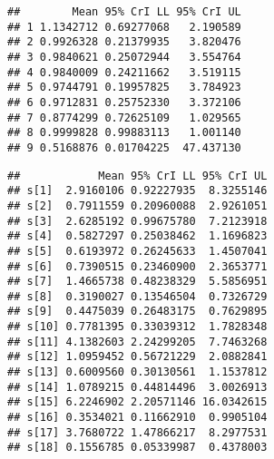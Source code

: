 \documentclass[]{article}
\newenvironment{Shaded}{\begin{snugshade}}{\end{snugshade}}
\newcommand{\CommentTok}[1]{\textcolor[rgb]{0.56,0.35,0.01}{\textit{#1}}}
\newcommand{\ControlFlowTok}[1]{\textcolor[rgb]{0.13,0.29,0.53}{\textbf{#1}}}
\newcommand{\DataTypeTok}[1]{\textcolor[rgb]{0.13,0.29,0.53}{#1}}
\newcommand{\DecValTok}[1]{\textcolor[rgb]{0.00,0.00,0.81}{#1}}
\newcommand{\FloatTok}[1]{\textcolor[rgb]{0.00,0.00,0.81}{#1}}
\newcommand{\KeywordTok}[1]{\textcolor[rgb]{0.13,0.29,0.53}{\textbf{#1}}}
\newcommand{\NormalTok}[1]{#1}
\newcommand{\OperatorTok}[1]{\textcolor[rgb]{0.81,0.36,0.00}{\textbf{#1}}}
\newcommand{\StringTok}[1]{\textcolor[rgb]{0.31,0.60,0.02}{#1}}
\begin{document}
\begin{verbatim}
##        Mean 95% CrI LL 95% CrI UL
## 1 1.1342712 0.69277068   2.190589
## 2 0.9926328 0.21379935   3.820476
## 3 0.9840621 0.25072944   3.554764
## 4 0.9840009 0.24211662   3.519115
## 5 0.9744791 0.19957825   3.784923
## 6 0.9712831 0.25752330   3.372106
## 7 0.8774299 0.72625109   1.029565
## 8 0.9999828 0.99883113   1.001140
## 9 0.5168876 0.01704225  47.437130
\end{verbatim}

\begin{Shaded}
\end{Shaded}

\begin{verbatim}
##            Mean 95% CrI LL 95% CrI UL
## s[1]  2.9160106 0.92227935  8.3255146
## s[2]  0.7911559 0.20960088  2.9261051
## s[3]  2.6285192 0.99675780  7.2123918
## s[4]  0.5827297 0.25038462  1.1696823
## s[5]  0.6193972 0.26245633  1.4507041
## s[6]  0.7390515 0.23460900  2.3653771
## s[7]  1.4665738 0.48238329  5.5856951
## s[8]  0.3190027 0.13546504  0.7326729
## s[9]  0.4475039 0.26483175  0.7629895
## s[10] 0.7781395 0.33039312  1.7828348
## s[11] 4.1382603 2.24299205  7.7463268
## s[12] 1.0959452 0.56721229  2.0882841
## s[13] 0.6009560 0.30130561  1.1537812
## s[14] 1.0789215 0.44814496  3.0026913
## s[15] 6.2246902 2.20571146 16.0342615
## s[16] 0.3534021 0.11662910  0.9905104
## s[17] 3.7680722 1.47866217  8.2977531
## s[18] 0.1556785 0.05339987  0.4378003
\end{verbatim}
\end{document}
